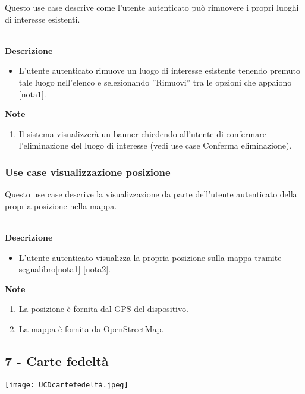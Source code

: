 \documentclass[a4paper,12pt]{article}
\begin{document}
Questo use case descrive come l'utente autenticato può  rimuovere  i propri luoghi di interesse esistenti.

\textbf{\\Descrizione}
\begin{itemize} \setlength\itemsep{0.01em}
\item L'utente autenticato rimuove un luogo di interesse esistente tenendo premuto tale luogo nell'elenco e selezionando ''Rimuovi'' tra le opzioni che appaiono [nota1].
\end{itemize}

\textbf{Note}
\begin{enumerate} \setlength\itemsep{0.01em}
\item Il sistema visualizzerà un banner chiedendo all'utente di confermare l'eliminazione del luogo di interesse  (vedi use case Conferma eliminazione).
\end{enumerate}



\subsubsection*{Use case visualizzazione posizione}

Questo use case descrive la visualizzazione da parte dell'utente autenticato della propria posizione nella mappa.

\textbf{\\Descrizione}
\begin{itemize} \setlength\itemsep{0.01em}
\item L'utente autenticato visualizza la propria posizione sulla mappa tramite segnalibro[nota1] [nota2].
\end{itemize}

\textbf{Note}
\begin{enumerate} \setlength\itemsep{0.01em}
\item La posizione è fornita dal GPS del dispositivo.
\item La mappa è fornita da OpenStreetMap.
\end{enumerate}





\subsection*{7 - Carte fedeltà}

\begin{center}
  \texttt{[image: UCDcartefedeltà.jpeg]}
\end{center}
\end{document}
